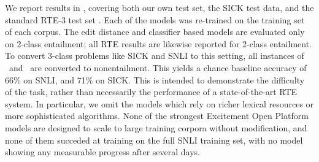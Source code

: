 We report results in , covering both our own test set,
  the SICK test data, and the standard RTE-3 test set \cite{giampiccolo2007third}.
Each of the models was re-trained on the training set of each corpus.
The edit distance and classifier based models are evaluated only on
  2-class entailment; all RTE results are likewise reported for 2-class entailment.
To convert 3-class problems like SICK and SNLI to this setting, all instances
  of \contradiction\ and \unknown\ are converted to nonentailment.
This yields a chance baseline accuracy of 66\% on SNLI, and 71\% on SICK.
This is intended to demonstrate the difficulty of the task, rather than necessarily
  the performance of a state-of-the-art RTE system.
In particular, we omit the models which rely on richer lexical resources or more
  sophisticated algorithms. None of the strongest Excitement Open Platform models
  are designed to scale to large training corpora without modification, and none of them
  succeded at training on the full SNLI training set, with no model showing any measurable    
  progress after several days.
  


%
%
